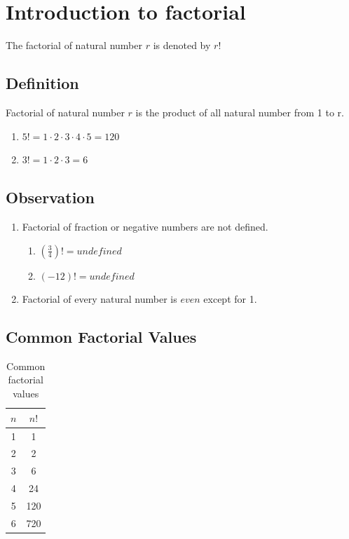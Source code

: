 \section*{Introduction to factorial}
The factorial of natural number $r$ is denoted by $r!$

\subsection*{Definition}
Factorial of natural number $r$ is the product of all natural number from 1 to r.
\begin{enumerate}[label=(\alph*)]
    \item $5! = 1\cdot2\cdot3\cdot4\cdot5 = 120$
    \item $3! = 1\cdot2\cdot3 = 6$
\end{enumerate}

\subsection*{Observation}
\begin{enumerate}
    \item Factorial of fraction or negative numbers are not defined.
    \begin{enumerate}
        \item $(\frac{3}{4})! = undefined$
        \item $(-12)! = undefined$
    \end{enumerate}
    \item Factorial of every natural number is $even$ except for 1.
\end{enumerate}
\subsection*{Common Factorial Values}

\begin{table}[h!]
\centering
\begin{tabular}{c c}
\hline
$n$ & $n!$ \\
\hline
1 & 1 \\
2 & 2 \\
3 & 6 \\
4 & 24 \\
5 & 120 \\
6 & 720 \\
\hline
\end{tabular}
\caption{Common factorial values}
\label{table:factorial}
\end{table}

